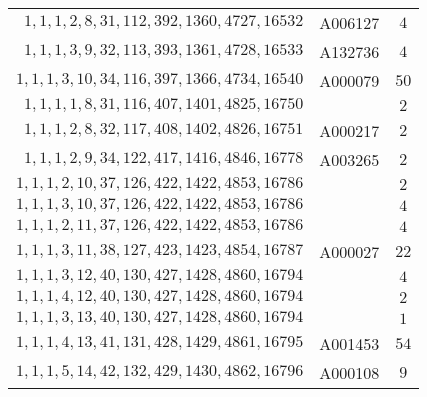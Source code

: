 \begin{longtabu}{|r|l|c|}
    \(    1,    1,    1,    2,    8,   31,  112,  392, 1360, 4727,16532\) &	A006127 & \(4\)\\
    \(    1,    1,    1,    3,    9,   32,  113,  393, 1361, 4728,16533\) &	A132736 & \(4\)\\
    \(    1,    1,    1,    3,   10,   34,  116,  397, 1366, 4734,16540\) &	A000079 & \(50\)\\
    \(    1,    1,    1,    1,    8,   31,  116,  407, 1401, 4825,16750\) &	& \(2\)\\
    \(    1,    1,    1,    2,    8,   32,  117,  408, 1402, 4826,16751\) &	A000217 & \(2\)\\
    \(    1,    1,    1,    2,    9,   34,  122,  417, 1416, 4846,16778\) & A003265	& \(2\)\\
    \(    1,    1,    1,    2,   10,   37,  126,  422, 1422, 4853,16786\) &	& \(2\)\\
    \(    1,    1,    1,    3,   10,   37,  126,  422, 1422, 4853,16786\) &	& \(4\)\\
    \(    1,    1,    1,    2,   11,   37,  126,  422, 1422, 4853,16786\) &	& \(4\)\\
    \(    1,    1,    1,    3,   11,   38,  127,  423, 1423, 4854,16787\) &	A000027 & \(22\)\\
    \(    1,    1,    1,    3,   12,   40,  130,  427, 1428, 4860,16794\) &	& \(4\)\\
    \(    1,    1,    1,    4,   12,   40,  130,  427, 1428, 4860,16794\) &	& \(2\)\\
    \(    1,    1,    1,    3,   13,   40,  130,  427, 1428, 4860,16794\) &	& \(1\)\\
    \(    1,    1,    1,    4,   13,   41,  131,  428, 1429, 4861,16795\) &	A001453 & \(54\)\\
    \(    1,    1,    1,    5,   14,   42,  132,  429, 1430, 4862,16796\) &	A000108 & \(9\)\\
    \hline
\end{longtabu}
